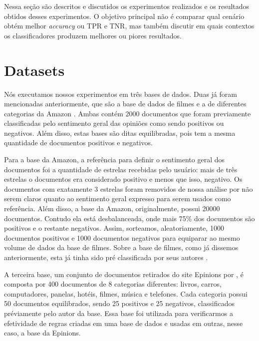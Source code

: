 
Nessa seção são descritos e discutidos os experimentos realizados e os resultados obtidos desses experimentos. O objetivo principal não é comparar qual cenário obtém melhor \textit{accuracy} ou TPR e TNR, mas também discutir em quais contextos os classificadores produzem melhores ou piores resultados.

\section{Datasets}

Nós executamos nossos experimentos em três bases de dados. Duas já foram mencionadas anteriormente, que são a base de dados de filmes \cite{pang2004sentimental} e a de diferentes categorias da Amazon \cite{wang2011latent}. Ambas contém 2000 documentos que foram previamente classificadas pelo sentimento geral das opiniões como sendo positivos ou negativos. Além disso, estas bases são ditas equilibradas, pois tem a mesma quantidade de documentos positivos e negativos. 

Para a base da Amazon, a referência para definir o sentimento geral dos documentos foi a quantidade de estrelas recebidas pelo usuário: mais de três estrelas o documentos era considerado positivo e menos que isso, negativo. Os documentos com exatamente 3 estrelas foram removidos de nossa análise por não serem claros quanto ao sentimento geral expresso para serem usados como referência. Além disso, a base da Amazon, originalmente, possui 20000 documentos. Contudo ela está  desbalanceada, onde mais 75\% dos documentos são positivos e o restante negativos. Assim, sorteamos, aleatoriamente, 1000 documentos positivos e 1000 documentos negativos para equiparar ao mesmo volume de dados da base de filmes. Sobre a base de filmes, como já dissemos anteriormente, esta já tinha sido pré classificada por seus autores \cite{pang2004sentimental}.

A terceira base, um conjunto de documentos retirados do site Epinions por \cite{taboada2011lexicon}, é composta por 400 documentos de 8 categorias diferentes: livros, carros, computadores, panelas, hotéis, filmes, música e telefones. Cada categoria possui 50 documentos equilibrados, sendo 25 positivos e 25 negativos, classificados préviamente pelo autor da base. Essa base foi utilizada para verificarmos a efetividade de regras criadas em uma base de dados e usadas em outras, nesse caso, a base da Epinions. 

